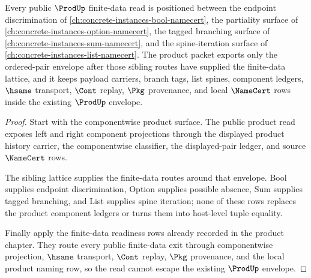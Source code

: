 \begin{theorem}
\label{thm:prod-finite-data-lattice-orphan-repair}
Every public $\ProdUp$ finite-data read is positioned between the endpoint discrimination of \autoref{ch:concrete-instances-bool-namecert}, the partiality surface of \autoref{ch:concrete-instances-option-namecert}, the tagged branching surface of \autoref{ch:concrete-instances-sum-namecert}, and the spine-iteration surface of \autoref{ch:concrete-instances-list-namecert}. The product packet exports only the ordered-pair envelope after those sibling routes have supplied the finite-data lattice, and it keeps payload carriers, branch tags, list spines, component ledgers, $\hsame$ transport, $\Cont$ replay, $\Pkg$ provenance, and local $\NameCert$ rows inside the existing $\ProdUp$ envelope.
\end{theorem}
\begin{proof}
Start with the componentwise product surface. The public product read exposes left and right component projections through the displayed product history carrier, the componentwise classifier, the displayed-pair ledger, and source $\NameCert$ rows.

The sibling lattice supplies the finite-data routes around that envelope. Bool supplies endpoint discrimination, Option supplies possible absence, Sum supplies tagged branching, and List supplies spine iteration; none of these rows replaces the product component ledgers or turns them into host-level tuple equality.

Finally apply the finite-data readiness rows already recorded in the product chapter. They route every public finite-data exit through componentwise projection, $\hsame$ transport, $\Cont$ replay, $\Pkg$ provenance, and the local product naming row, so the read cannot escape the existing $\ProdUp$ envelope.
\end{proof}
